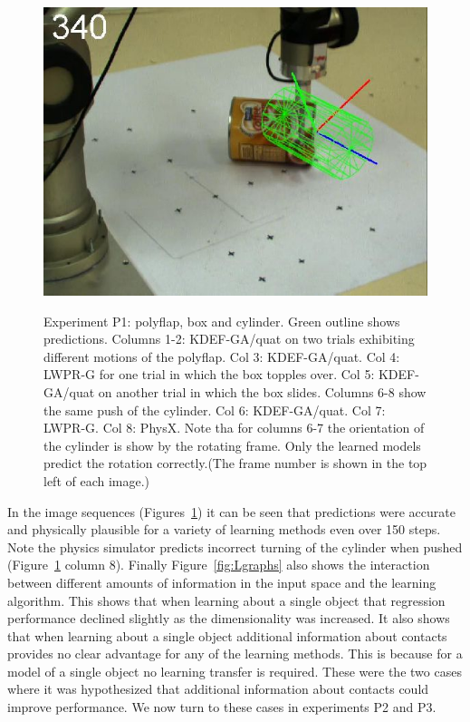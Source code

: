 \begin{figure}[htbp]
{\includegraphics[width=\imgAXwid]{images/A3_physx_39_5}
}
\caption {Experiment P1: polyflap, box and cylinder. Green outline shows
  predictions. Columns 1-2: KDEF-GA/quat on two trials exhibiting
  different motions of the polyflap. Col 3: KDEF-GA/quat. Col 4: LWPR-G for one trial in
  which the box topples over. Col 5: KDEF-GA/quat on another trial in
  which the box slides. Columns 6-8 show the same push of the
  cylinder. Col 6: KDEF-GA/quat. Col 7: LWPR-G. Col 8: PhysX. Note tha
  for columns 6-7 the orientation of the cylinder is show by the
  rotating frame. Only the learned models predict the rotation
  correctly.(The
  frame number is shown in the top left of each image.)  }
\label{fig:ExperimentL2}
\end{figure}

In the image sequences
(Figures~\ref{fig:ExperimentL2}) it can be
seen that predictions were accurate and physically plausible for a
variety of learning methods even over 150 steps. Note the physics
simulator predicts incorrect turning of the cylinder when pushed
(Figure~\ref{fig:ExperimentL2} column 8). Finally
Figure~\ref{fig:Lgraphs} also shows the interaction between different
amounts of information in the input space and the learning
algorithm. This shows that when learning about a single object that
regression performance declined slightly as the dimensionality was
increased. It also shows that when learning about a single object
additional information about contacts provides no clear advantage for
any of the learning methods. This is because for a model of a single
object no learning transfer is required. These were the two cases
where it was hypothesized that additional information about contacts
could improve performance. We now turn to these cases in experiments P2
and P3.




